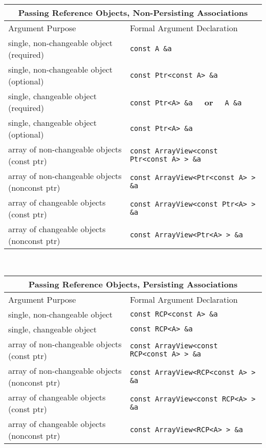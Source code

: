 %
\begin{tabular}{|l|l|}
%
\multicolumn{2}{c}{\textbf{Passing Reference Objects, Non-Persisting Associations}} \\
%
\hline
Argument Purpose
& Formal Argument Declaration \\
\hline
\hline
single, non-changeable object (required)
& {}\texttt{const A \&a} \\
\hline
single, non-changeable object (optional)
& {}\texttt{const Ptr<const A> \&a} \\
\hline
single, changeable object (required)
& {}\texttt{const Ptr<A> \&a}  $\;\;\;\;$\textbf{or}$\;\;\;\;$ {}\texttt{A \&a} \\
\hline
single, changeable object (optional)
& \texttt{const Ptr<A> \&a} \\
\hline
array of non-changeable objects (const ptr)
& {}\texttt{const ArrayView<const Ptr<const A> > \&a} \\
\hline
array of non-changeable objects (nonconst ptr)
& {}\texttt{const ArrayView<Ptr<const A> > \&a} \\
\hline
array of changeable objects (const ptr)
& {}\texttt{const ArrayView<const Ptr<A> > \&a} \\
\hline
array of changeable objects (nonconst ptr)
& {}\texttt{const ArrayView<Ptr<A> > \&a} \\
\hline
\end{tabular} \\[3ex]
%
\begin{tabular}{|l|l|}
%
\multicolumn{2}{c}{\textbf{Passing Reference Objects, Persisting Associations}} \\
%
\hline
Argument Purpose
& Formal Argument Declaration \\
\hline
\hline
single, non-changeable object
& {}\texttt{const RCP<const A> \&a} \\
\hline
single, changeable object
& {}\texttt{const RCP<A> \&a} \\
\hline
array of non-changeable objects (const ptr)
& {}\texttt{const ArrayView<const RCP<const A> > \&a} \\
\hline
array of non-changeable objects (nonconst ptr)
& {}\texttt{const ArrayView<RCP<const A> > \&a} \\
\hline
array of changeable objects (const ptr)
& {}\texttt{const ArrayView<const RCP<A> > \&a} \\
\hline
array of changeable objects (nonconst ptr)
& {}\texttt{const ArrayView<RCP<A> > \&a} \\
\hline
\end{tabular}
%
